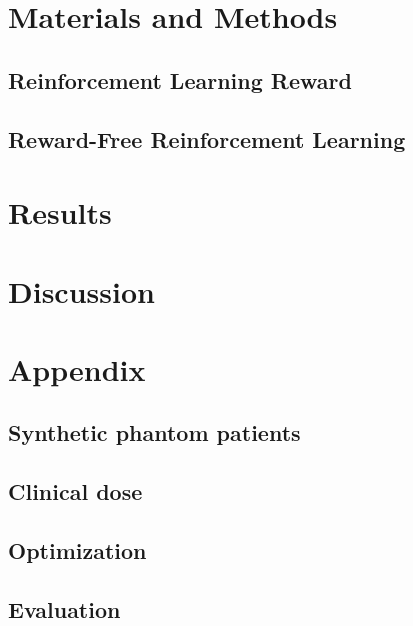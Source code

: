 \section{Materials and Methods}

\subsection{Reinforcement Learning Reward}

\subsection{Reward-Free Reinforcement Learning}


\section{Results}

\section{Discussion}



\section*{Appendix}

\subsection*{Synthetic phantom patients}

\subsection*{Clinical dose}

\subsection*{Optimization}

\subsection*{Evaluation}
